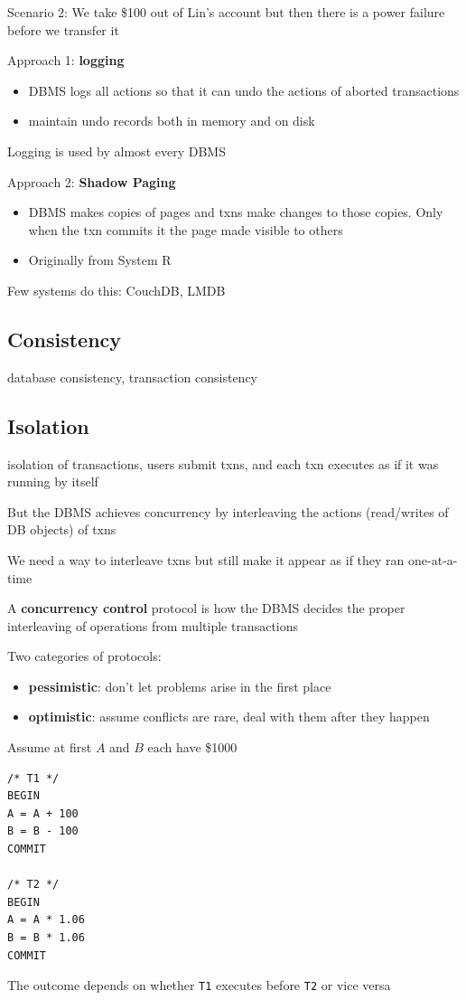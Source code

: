 \documentclass[11pt]{article}
\begin{document}
Scenario 2: We take \$100 out of Lin's account but then there is a power failure before we
transfer it

Approach 1: \textbf{logging}
\begin{itemize}
\item DBMS logs all actions so that it can undo the actions of aborted transactions
\item maintain undo records both in memory and on disk
\end{itemize}

Logging is used by almost every DBMS

Approach 2: \textbf{Shadow Paging}
\begin{itemize}
\item DBMS makes copies of pages and txns make changes to those copies. Only when the txn commits it
the page made visible to others
\item Originally from System R
\end{itemize}

Few systems do this: CouchDB, LMDB
\subsection{Consistency}
\label{sec:org6834b4e}
database consistency, transaction consistency

\subsection{Isolation}
\label{sec:orgaca6cc1}
isolation of transactions, users submit txns, and each txn executes as if it was running by
itself

But the DBMS achieves concurrency by interleaving the actions (read/writes of DB objects) of
txns

We need a way to interleave txns but still make it appear as if they ran one-at-a-time

A \textbf{concurrency control} protocol is how the DBMS decides the proper interleaving of operations
from multiple transactions

Two categories of protocols:
\begin{itemize}
\item \textbf{pessimistic}: don't let problems arise in the first place
\item \textbf{optimistic}: assume conflicts are rare, deal with them after they happen
\end{itemize}

Assume at first \(A\) and \(B\) each have \$1000
\begin{verbatim}
/* T1 */
BEGIN
A = A + 100
B = B - 100
COMMIT

/* T2 */
BEGIN
A = A * 1.06
B = B * 1.06
COMMIT
\end{verbatim}
The outcome depends on whether \texttt{T1} executes before \texttt{T2} or vice versa
\end{document}
